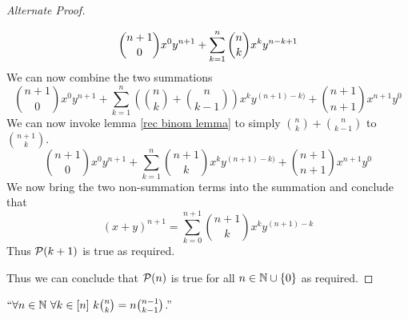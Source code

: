 \begin{proof}[Alternate Proof]
\begin{itemize}
\[                        \dbinom{n + 1}{0} x^0y^{n + 1} + \displaystyle\sum_{k = 1}^{n} \dbinom{n}{k}x^k y^{n - k + 1}
                    \]
                    We can now combine the two summations
                    \[
                        \binom{n + 1}{0} x^0y^{n + 1} +
                        \sum_{k = 1}^{n} \left(\binom{n}{k} + \binom{n}{k - 1}\right) x^{k} y^{(n + 1) - k)} +
                        \binom{n + 1}{n + 1} x^{n + 1}y^0
                    \]
                    We can now invoke lemma \ref{rec binom lemma} to simply $\binom{n}{k} + \binom{n}{k - 1}$
                    to $\binom{n + 1}{k}$.
                    \[
                        \binom{n + 1}{0} x^0y^{n + 1} +
                        \sum_{k = 1}^{n} \binom{n + 1}{k}x^{k} y^{(n + 1) - k)} +
                        \binom{n + 1}{n + 1} x^{n + 1}y^0
                    \]
                    We now bring the two non-summation terms into the summation and conclude
                    that
                    \[
                        (x + y)^{n + 1} = \sum_{k = 0}^{n + 1} \binom{n + 1}{k} x^k y^{(n + 1) - k}
                    \]
                    Thus $\mathcal{P}(k + 1)$ is true as required.
            \end{itemize}
            Thus we can conclude that $\mathcal{P}(n)$ is true for all $n \in \mathbb{N} \cup \left\{0\right\}$
            as required. \QED
        \end{proof}
        \begin{theorem}
            $``\forall n \in \mathbb{N} \ \forall k \in [n] \ k \binom{n}{k} = n \binom{n - 1}{k - 1}$.''
        \end{theorem}

